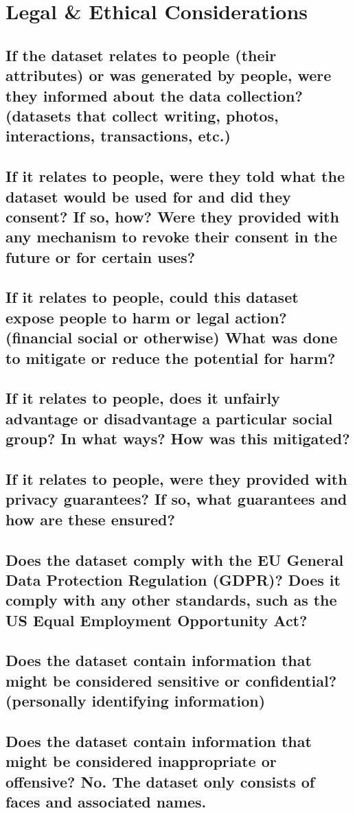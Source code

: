 \section*{Legal \& Ethical Considerations}
\subsection*{If the dataset relates to people (\eg their attributes) or was generated by people, were they informed about the data collection? (\eg datasets that collect writing, photos, interactions, transactions, etc.)}
\noindent


\subsection*{If it relates to people, were they told what the dataset would be used for and did they consent? If so, how? Were they provided with any mechanism to revoke their consent in the future or for certain uses?}
\noindent

\subsection*{If it relates to people, could this dataset expose people to harm or legal action? (\eg financial social or otherwise) What was done to mitigate or reduce the potential for harm?}
\noindent

\subsection*{If it relates to people, does it unfairly advantage or disadvantage a particular social group? In what ways? How was this mitigated?}
\noindent

\subsection*{If it relates to people, were they provided with privacy guarantees? If so, what guarantees and how are these ensured?}
\noindent

\subsection*{Does the dataset comply with the EU General Data Protection Regulation (GDPR)? Does it comply with any other standards, such as the US Equal Employment Opportunity Act?}
\noindent

\subsection*{Does the dataset contain information that might be considered sensitive or confidential? (\eg personally identifying information)}
\noindent

\subsection*{Does the dataset contain information that might be considered inappropriate or offensive? No. The dataset only consists of faces and associated names.}
\noindent